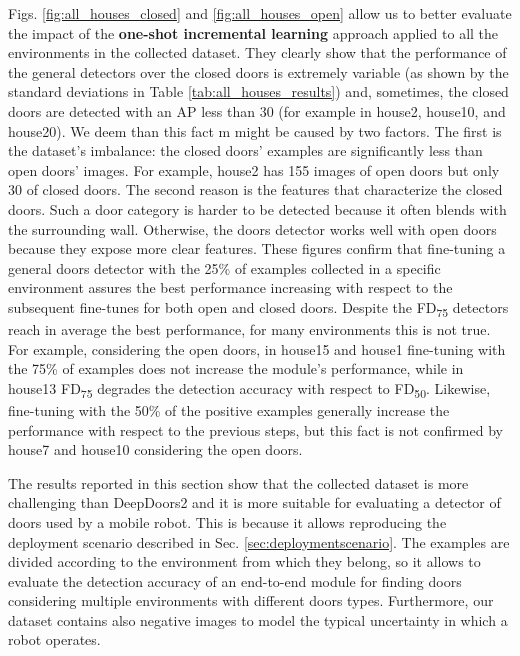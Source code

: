 Figs. \ref{fig:all_houses_closed} and \ref{fig:all_houses_open} allow us to better evaluate the impact of the \textbf{one-shot incremental learning} approach applied to all the environments in the collected dataset. They clearly show that the performance of the general detectors over the closed doors is extremely variable (as shown by the standard deviations in Table \ref{tab:all_houses_results}) and, sometimes, the closed doors are detected with an AP less than 30 (for example in \textsf{house2}, \textsf{house10}, and \textsf{house20}). We deem than this fact m might be caused by two factors. The first is the dataset's imbalance: the closed doors' examples are significantly less than open doors' images. For example, \textsf{house2} has 155 images of open doors but only 30 of closed doors. The second reason is the features that characterize the closed doors. Such a door category is harder to be detected because it often blends with the surrounding wall. Otherwise, the doors detector works well with open doors because they expose more clear features. These figures confirm that fine-tuning a general doors detector with the 25\% of examples collected in a specific environment assures the best performance increasing with respect to the subsequent fine-tunes for both open and closed doors. Despite the \textsf{FD\textsubscript{75}} detectors reach in average the best performance, for many environments this is not true. For example, considering the open doors, in \textsf{house15} and \textsf{house1} fine-tuning with the 75\% of examples does not increase the module's performance, while in \textsf{house13} \textsf{FD\textsubscript{75}} degrades the detection accuracy with respect to \textsf{FD\textsubscript{50}}. Likewise, fine-tuning with the 50\% of the positive examples generally increase the performance with respect to the previous steps, but this fact is not confirmed by \textsf{house7} and \textsf{house10} considering the open doors.

The results reported in this section show that the collected dataset is more challenging than DeepDoors2 \cite{deepdoors2} and it is more suitable for evaluating a detector of doors used by a mobile robot. This is because it allows reproducing the deployment scenario described in Sec. \ref{sec:deploymentscenario}. The examples are divided according to the environment from which they belong, so it allows to evaluate the detection accuracy of an end-to-end module for finding doors considering multiple environments with different doors types. Furthermore, our dataset contains also negative images to model the typical uncertainty in which a robot operates. 

